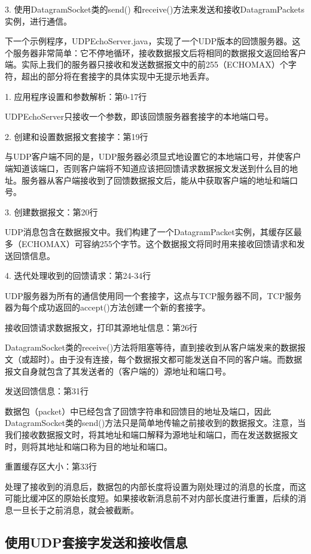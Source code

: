 		3. 使用DatagramSocket类的send() 和receive()方法来发送和接收DatagramPackets实例，进行通信。 

		下一个示例程序，UDPEchoServer.java，实现了一个UDP版本的回馈服务器。这个服务器非常简单：它不停地循环，接收数据报文后将相同的数据报文返回给客户端。实际上我们的服务器只接收和发送数据报文中的前255（ECHOMAX）个字符，超出的部分将在套接字的具体实现中无提示地丢弃。 

		

		1. 应用程序设置和参数解析：第0-17行 

		UDPEchoServer只接收一个参数，即该回馈服务器套接字的本地端口号。 

		2. 创建和设置数据报文套接字：第19行 

		与UDP客户端不同的是，UDP服务器必须显式地设置它的本地端口号，并使客户端知道该端口，否则客户端将不知道应该把回馈请求数据报文发送到什么目的地址。服务器从客户端接收到了回馈数据报文后，能从中获取客户端的地址和端口号。 

		3. 创建数据报文：第20行 

		UDP消息包含在数据报文中。我们构建了一个DatagramPacket实例，其缓存区最多（ECHOMAX）可容纳255个字节。这个数据报文将同时用来接收回馈请求和发送回馈信息。 

		4. 迭代处理收到的回馈请求：第24-34行 

		UDP服务器为所有的通信使用同一个套接字，这点与TCP服务器不同，TCP服务器为每个成功返回的accept()方法创建一个新的套接字。 

		接收回馈请求数据报文，打印其源地址信息：第26行 

		DatagramSocket类的receive()方法将阻塞等待，直到接收到从客户端发来的数据报文（或超时）。由于没有连接，每个数据报文都可能发送自不同的客户端。而数据报文自身就包含了其发送者的（客户端的）源地址和端口号。 

		发送回馈信息：第31行 

		数据包（packet）中已经包含了回馈字符串和回馈目的地址及端口，因此DatagramSocket类的send()方法只是简单地传输之前接收到的数据报文。注意，当我们接收数据报文时，将其地址和端口解释为源地址和端口，而在发送数据报文时，则将其地址和端口称为目的地址和端口。 

		重置缓存区大小：第33行 

		处理了接收到的消息后，数据包的内部长度将设置为刚处理过的消息的长度，而这可能比缓冲区的原始长度短。如果接收新消息前不对内部长度进行重置，后续的消息一旦长于之前消息，就会被截断。 

	\subsection{使用UDP套接字发送和接收信息} 

